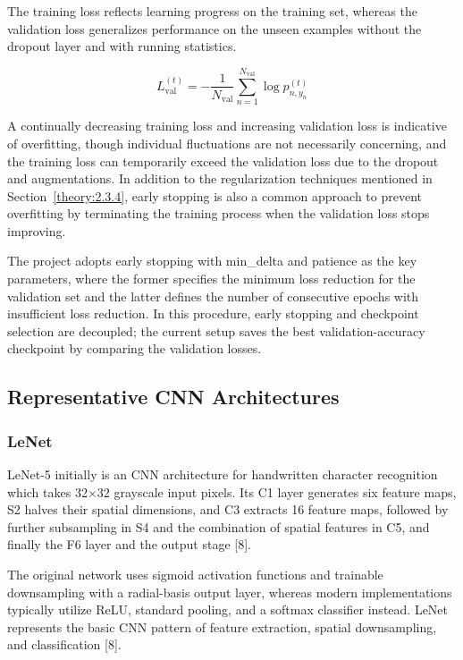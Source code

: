 \documentclass[11pt,a4paper]{article}
\begin{document}
The training loss reflects learning progress on the training set, whereas the validation loss generalizes performance on the unseen examples without the dropout layer and with running statistics.

\[
{ L}_{\mathrm{val}}^{\left( t\right) }=-\frac{1}{{N}_{\mathrm{val}}}\sum _{n=1}^{{N}_{\mathrm{val}}} \log {p}_{n,{y}_{n}}^{\left( t\right) }
\]

A continually decreasing training loss and increasing validation loss is indicative of overfitting, though individual fluctuations are not necessarily concerning, and the training loss can temporarily exceed the validation loss due to the dropout and augmentations. In addition to the regularization techniques mentioned in Section~\ref{theory:2.3.4}, early stopping is also a common approach to prevent overfitting by terminating the training process when the validation loss stops improving.

The project adopts early stopping with min\_delta and patience as the key parameters, where the former specifies the minimum loss reduction for the validation set and the latter defines the number of consecutive epochs with insufficient loss reduction. In this procedure, early stopping and checkpoint selection are decoupled; the current setup saves the best validation-accuracy checkpoint by comparing the validation losses.

\subsection{Representative CNN Architectures}\label{theory:2.5}

\subsubsection{LeNet}\label{theory:2.5.1}

LeNet-5 initially is an CNN architecture for handwritten character recognition which takes 32\(\times\)32 grayscale input pixels. Its C1 layer generates six feature maps, S2 halves their spatial dimensions, and C3 extracts 16 feature maps, followed by further subsampling in S4 and the combination of spatial features in C5, and finally the F6 layer and the output stage [8].

The original network uses sigmoid activation functions and trainable downsampling with a radial-basis output layer, whereas modern implementations typically utilize ReLU, standard pooling, and a softmax classifier instead. LeNet represents the basic CNN pattern of feature extraction, spatial downsampling, and classification [8].
\end{document}
